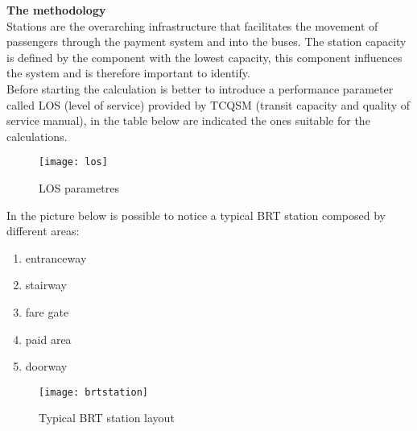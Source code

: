 \documentclass{article}
\begin{document}
\textbf{The methodology}\\
Stations are the overarching infrastructure that facilitates the movement of passengers through the payment system and into the buses. The station capacity is defined by the component with the lowest capacity, this component influences the system and is therefore important to identify.\\
Before starting the calculation is better to introduce a performance parameter called LOS (level of service) provided by TCQSM (transit capacity and quality of service manual)\cite{tqdm}, in the table below are indicated the ones suitable for the calculations.\\
\begin{figure}[H]
\centering
\texttt{[image: los]}
\caption{LOS parametres}
\end{figure} 
In the picture below is possible to notice a typical BRT station composed by different areas:
\begin{enumerate}
\item entranceway 
\item stairway 
\item fare gate 
\item paid area 
\item doorway 
\end{enumerate}
\begin{figure}[H]
\centering
\texttt{[image: brtstation]}
\caption{Typical BRT station layout}
\end{figure} 
\end{document}
